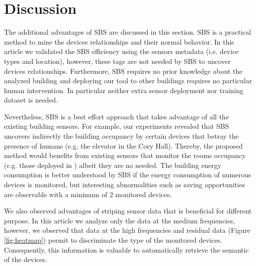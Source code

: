 \section{Discussion}
The additional advantages of SBS are discussed in this section.
SBS is a practical method to mine the devices relationships and their normal behavior. 
In this article we validated the SBS efficiency using the sensors metadata (i.e. device types and location), however, these tags are not needed by SBS to uncover devices relationships.
Furthermore, SBS requires no prior knowledge about the analyzed building and deploying our tool to other buildings requires no particular human intervention.
In particular neither extra sensor deployment nor training dataset is needed. 

Nevertheless, SBS is a best effort approach that takes advantage of all the existing building sensors.
For example, our experiments revealed that SBS uncovers indirectly the building occupancy by certain devices that betray the presence of humans (e.g. the elevator in the Cory Hall). 
Thereby, the proposed method would benefits from existing sensors that monitor the rooms occupancy (e.g. those deployed in \cite{agarwal:ipsn2011,erickson:ipsn2011}) albeit they are no needed.
The building energy consumption is better understood by SBS if the energy consumption of numerous devices is monitored, 
but interesting abnormalities such as saving opportunities are observable with a minimum of 2 monitored devices.


We also observed advantages of striping sensor data that is beneficial for different purpose.
In this article we analyze only the data at the medium frequencies, however, we observed that data at the high frequencies and residual data (Figure \ref{fig:heatmap}) permit to discriminate the type of the monitored devices.
Consequently, this information is valuable to automatically retrieve the semantic of the devices.


% 
% 
